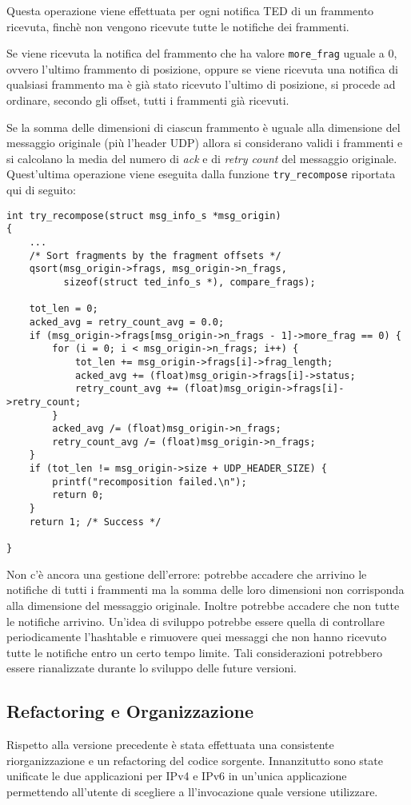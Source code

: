 \documentclass[a4paper,10pt]{article}
\begin{document}
Questa operazione viene effettuata per ogni notifica TED di un frammento
ricevuta, finchè non vengono ricevute tutte le notifiche dei frammenti.

Se viene ricevuta la notifica del frammento che ha
valore \texttt{more\_frag} uguale a 0, ovvero l'ultimo frammento di
posizione, oppure se viene ricevuta una notifica di qualsiasi frammento
ma è già stato ricevuto l'ultimo di posizione,
si procede ad ordinare, secondo gli offset, tutti i frammenti già ricevuti. 

Se la somma delle dimensioni di ciascun frammento è uguale alla
dimensione del messaggio originale (più l'header UDP)  allora si considerano
 validi i frammenti e si calcolano la media del numero di \emph{ack} e di
\emph{retry count} del messaggio originale.
Quest'ultima operazione viene eseguita dalla funzione
\texttt{try\_recompose} riportata qui di seguito:

\begin{lstlisting}
int try_recompose(struct msg_info_s *msg_origin)
{
	...
	/* Sort fragments by the fragment offsets */
	qsort(msg_origin->frags, msg_origin->n_frags,
	      sizeof(struct ted_info_s *), compare_frags);
	
	tot_len = 0;
	acked_avg = retry_count_avg = 0.0;
	if (msg_origin->frags[msg_origin->n_frags - 1]->more_frag == 0) {
		for (i = 0; i < msg_origin->n_frags; i++) { 
			tot_len += msg_origin->frags[i]->frag_length;
			acked_avg += (float)msg_origin->frags[i]->status;	
			retry_count_avg += (float)msg_origin->frags[i]->retry_count;
		}
		acked_avg /= (float)msg_origin->n_frags;
		retry_count_avg /= (float)msg_origin->n_frags;
	}
	if (tot_len != msg_origin->size + UDP_HEADER_SIZE) {
		printf("recomposition failed.\n");
		return 0;
	}
	return 1; /* Success */

}
\end{lstlisting}


Non c'è ancora una gestione dell'errore: potrebbe accadere che arrivino
le notifiche di tutti
i frammenti ma la somma delle loro dimensioni non corrisponda alla
dimensione del
messaggio originale. Inoltre potrebbe accadere che non tutte le
notifiche arrivino. Un'idea di sviluppo potrebbe essere quella di
controllare periodicamente l'hashtable e rimuovere quei messaggi che non
hanno ricevuto tutte le notifiche entro un certo tempo limite. 
Tali considerazioni potrebbero essere rianalizzate durante lo sviluppo
delle future versioni. 
\newpage
\subsection{Refactoring e Organizzazione}
Rispetto alla versione precedente è stata effettuata una consistente
riorganizzazione e un refactoring del codice sorgente.
Innanzitutto sono state unificate le due applicazioni per IPv4 e IPv6 in
un'unica applicazione permettendo all'utente di scegliere a
ll'invocazione quale versione
utilizzare. \\
\end{document}
